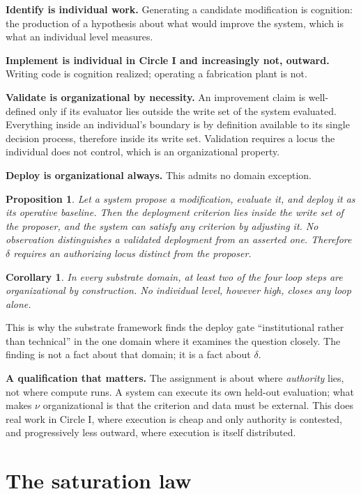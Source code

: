 \documentclass[11pt]{article}
\newtheorem{proposition}{Proposition}
\newtheorem{corollary}{Corollary}
\begin{document}
\textbf{Identify is individual work.} Generating a candidate modification is cognition: the production of a hypothesis about what would improve the system, which is what an individual level measures.

\textbf{Implement is individual in Circle I and increasingly not, outward.} Writing code is cognition realized; operating a fabrication plant is not.

\textbf{Validate is organizational by necessity.} An improvement claim is well-defined only if its evaluator lies outside the write set of the system evaluated. Everything inside an individual's boundary is by definition available to its single decision process, therefore inside its write set. Validation requires a locus the individual does not control, which is an organizational property.

\textbf{Deploy is organizational always.} This admits no domain exception.

\begin{proposition}\label{prop:deploy}
Let a system propose a modification, evaluate it, and deploy it as its operative baseline. Then the deployment criterion lies inside the write set of the proposer, and the system can satisfy any criterion by adjusting it. No observation distinguishes a validated deployment from an asserted one. Therefore $\delta$ requires an authorizing locus distinct from the proposer.
\end{proposition}

\begin{corollary}\label{cor:twosteps}
In every substrate domain, at least two of the four loop steps are organizational by construction. No individual level, however high, closes any loop alone.
\end{corollary}

This is why the substrate framework finds the deploy gate ``institutional rather than technical'' in the one domain where it examines the question closely. The finding is not a fact about that domain; it is a fact about $\delta$.

\textbf{A qualification that matters.} The assignment is about where \emph{authority} lies, not where compute runs. A system can execute its own held-out evaluation; what makes $\nu$ organizational is that the criterion and data must be external. This does real work in Circle I, where execution is cheap and only authority is contested, and progressively less outward, where execution is itself distributed.

\section{The saturation law}\label{sec:law}
\end{document}
